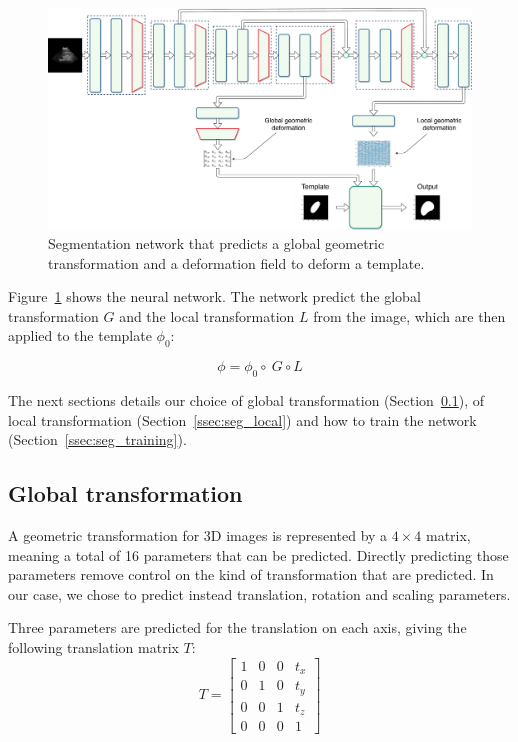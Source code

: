 \begin{figure}[htbp]
	\includegraphics[width=\textwidth]{img_seg/deformation_network}
    \caption{Segmentation network that predicts a global geometric transformation and a deformation field to deform a template.}
    \label{fig:deform_network}
\end{figure}

Figure~\ref{fig:deform_network} shows the neural network. The network predict the global transformation $G$ and the local transformation $L$ from the image, which are then applied to the template $\phi_0$:

\begin{equation}
    \phi = \phi_0 \circ \ G \circ L
\end{equation}

The next sections details our choice of global transformation (Section~\ref{ssec:seg_global}), of local transformation (Section~\ref{ssec:seg_local}) and how to train the network (Section~\ref{ssec:seg_training}).

\subsection{Global transformation}
\label{ssec:seg_global}

A geometric transformation for 3D images is represented by a $4 \times 4$ matrix, meaning a total of 16 parameters that can be predicted. Directly predicting those parameters remove control on the kind of transformation that are predicted. In our case, we chose to predict instead translation, rotation and scaling parameters. 

Three parameters are predicted for the translation on each axis, giving the following translation matrix $T$:
\begin{equation*}
    T = 
    \begin{bmatrix}
        1 & 0 & 0 & t_x \\
        0 & 1 & 0 & t_y \\
        0 & 0 & 1 & t_z \\ 
        0 & 0 & 0 & 1
    \end{bmatrix}
\end{equation*}

